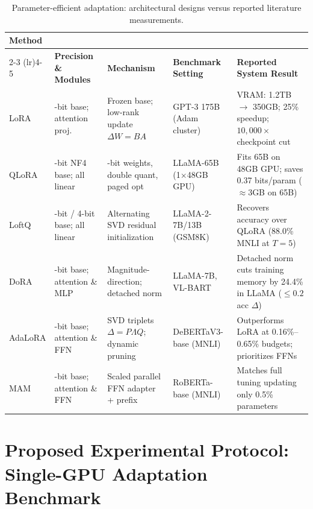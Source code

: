 \documentclass[11pt,a4paper]{article}
\begin{document}
\begin{table}[t]
\centering
\scriptsize
\caption{Parameter-efficient adaptation: architectural designs versus reported literature measurements.}
\label{tab:comparison}
\begin{tabularx}{\textwidth}{l >{\raggedright\arraybackslash}p{2.1cm} >{\raggedright\arraybackslash}p{2.5cm} >{\raggedright\arraybackslash}p{2.0cm} >{\raggedright\arraybackslash}X}
\toprule
\textbf{Method} & \multicolumn{2}{c}{\textbf{Architectural Specifications}} & \multicolumn{2}{c}{\textbf{Reported Literature Measurements}} \\
\cmidrule(lr){2-3} \cmidrule(lr){4-5}
 & \textbf{Precision \& Modules} & \textbf{Mechanism} & \textbf{Benchmark Setting} & \textbf{Reported System Result} \\
\midrule
LoRA \cite{hu2021lora} & 16-bit base; attention proj. & Frozen base; low-rank update $\Delta W = BA$ & GPT-3 175B (Adam cluster) & VRAM: 1.2TB $\to$ 350GB; 25\% speedup; $10,000\times$ checkpoint cut \\
QLoRA \cite{dettmers2023qlora} & 4-bit NF4 base; all linear & 4-bit weights, double quant, paged opt & LLaMA-65B (1$\times$48GB GPU) & Fits 65B on 48GB GPU; saves 0.37 bits/param ($\approx 3$GB on 65B) \\
LoftQ \cite{li2023loftq} & 2-bit / 4-bit base; all linear & Alternating SVD residual initialization & LLaMA-2-7B/13B (GSM8K) & Recovers accuracy over QLoRA (88.0\% MNLI at $T=5$) \\
DoRA \cite{liu2024dora} & 16-bit base; attention \& MLP & Magnitude-direction; detached norm & LLaMA-7B, VL-BART & Detached norm cuts training memory by 24.4\% in LLaMA ($\le 0.2$ acc $\Delta$) \\
AdaLoRA \cite{zhang2023adalora} & 16-bit base; attention \& FFN & SVD triplets $\Delta = P \Lambda Q$; dynamic pruning & DeBERTaV3-base (MNLI) & Outperforms LoRA at 0.16\%--0.65\% budgets; prioritizes FFNs \\
MAM \cite{he2021unified} & 16-bit base; attention \& FFN & Scaled parallel FFN adapter + prefix & RoBERTa-base (MNLI) & Matches full tuning updating only 0.5\% parameters \\
\bottomrule
\end{tabularx}
\end{table}

\section{Proposed Experimental Protocol: Single-GPU Adaptation Benchmark}
\end{document}
